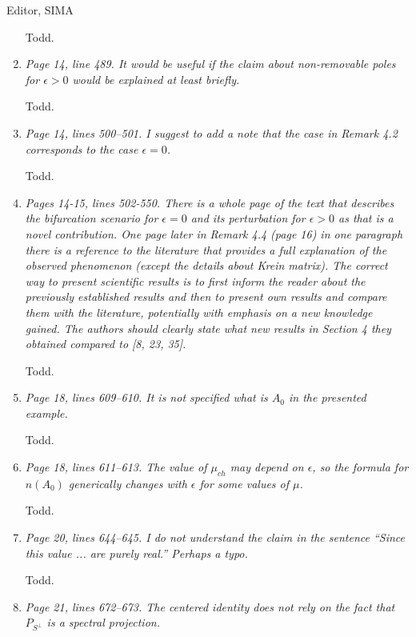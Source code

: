 \documentclass[11pt]{letter}
\begin{document}
\begin{letter}{Editor, SIMA}
\begin{enumerate}
Todd.

\item \emph{Page 14, line 489. It would be useful if the claim about non-removable poles for $\epsilon > 0$ would be explained at least briefly.}
\vspace{4mm}

Todd.

\item \emph{Page 14, lines 500–501. I suggest to add a note that the case in Remark 4.2 corresponds to the case $\epsilon = 0$.}
\vspace{4mm}

Todd.

\item \emph{Pages 14-15, lines 502-550. There is a whole page of the text that describes the bifurcation scenario for $\epsilon = 0$ and its perturbation for $\epsilon > 0$ as that is a novel contribution. One page later in Remark 4.4 (page 16) in one paragraph there is a reference to the literature that provides a full explanation of the observed phenomenon (except the details about Krein matrix). The correct way to present scientific results is to first inform the reader about the previously established results and then to present own results and compare them with the literature, potentially with emphasis on a new knowledge gained. The authors should clearly state what new results in Section 4 they obtained compared to [8, 23, 35].}
\vspace{4mm}

Todd.

\item \emph{Page 18, lines 609–610. It is not specified what is $A_0$ in the presented example.}
\vspace{4mm}

Todd.

\item \emph{Page 18, lines 611–613. The value of $\mu_{ch}$ may depend on $\epsilon$, so the formula for $n(A_0)$ generically changes with $\epsilon$ for some values of $\mu$.}
\vspace{4mm}

Todd.

\item \emph{Page 20, lines 644–645. I do not understand the claim in the sentence ``Since this value ... are purely real.'' Perhaps a typo.}
\vspace{4mm}

Todd.

\item \emph{Page 21, lines 672–673. The centered identity does not rely on the fact that $P_{S^\perp}$ is a spectral projection.}


\end{enumerate}
\end{letter}
\end{document}

